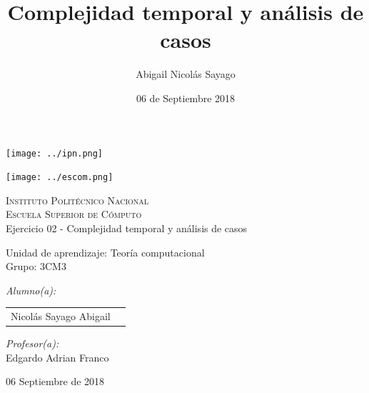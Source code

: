 \documentclass[12pt]{article}
\date{06 de Septiembre 2018}
\title{Complejidad temporal y análisis de casos}
\author{Abigail Nicolás Sayago}
\begin{document}
\begin{titlepage}
			\begin{center}
				\noindent
				\begin{minipage}{0.5\textwidth}
					\begin{flushleft} \large
						\texttt{[image: ../ipn.png]}
					\end{flushleft}
				\end{minipage}%
				\begin{minipage}{0.55\textwidth}
					\begin{flushright} \large
						\texttt{[image: ../escom.png]}
					\end{flushright}
				\end{minipage}
				
				\textsc{\LARGE Instituto Politécnico Nacional}\\[0.5cm]
				
				\textsc{\Large Escuela Superior de Cómputo}\\[1cm]
				
				
				{ \huge Ejercicio 02 - Complejidad temporal y análisis de casos  \\[1cm] }
				
				{ \Large Unidad de aprendizaje: Teoría computacional} \\[1cm]
				
				{ \Large Grupo: 3CM3 } \\[1cm]
				
				\noindent
				\begin{minipage}{0.5\textwidth}
					\begin{flushleft} \large
						\emph{Alumno(a):}\\
						
						\begin{tabular}{ll}
					     Nicolás Sayago Abigail\\
					\end{tabular}
					\end{flushleft}
				\end{minipage}%
				\begin{minipage}{0.5\textwidth}
					\begin{flushright} \large
						\emph{Profesor(a):} \\
					    Edgardo Adrian Franco  \\
					\end{flushright}
				\end{minipage}
				
				\vfill
				
				{\large 06 Septiembre de 2018}
			\end{center}
		\end{titlepage}
	\tableofcontents
  \newpage
\end{document}

